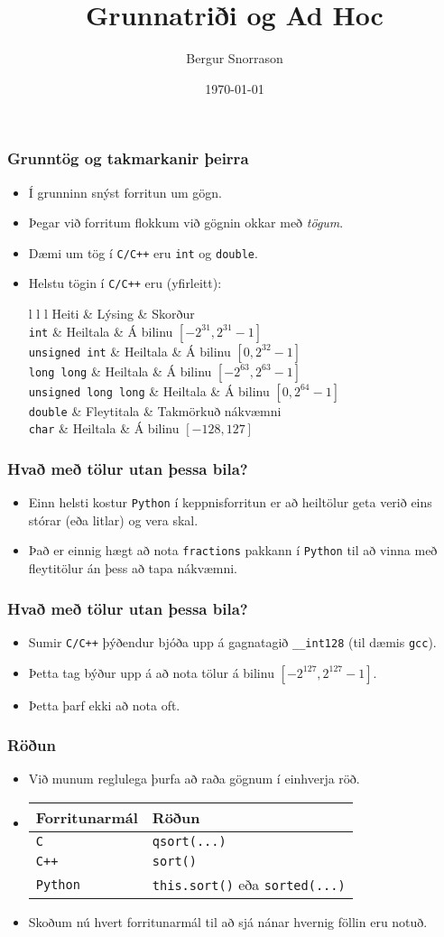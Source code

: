 \documentclass{beamer}
\title{Grunnatriði og Ad Hoc}
\author{Bergur Snorrason}
\date{\today}
\newcommand\env[2]
{
	\begin{#1}
	#2
	\end{#1}
}
\newcommand\code[1]{\tiny}
\begin{document}
\frame{\titlepage}

\env{frame}
{
	\frametitle{Grunntög og takmarkanir þeirra}
	\env{itemize}
	{
		\item<1-> Í grunninn snýst forritun um gögn.
		\item<2-> Þegar við forritum flokkum við gögnin okkar með \emph{tögum}.
		\item<3-> Dæmi um tög í \texttt{C/C++} eru \texttt{int} og \texttt{double}.
		\item<4-> Helstu tögin í \texttt{C/C++} eru (yfirleitt):
		\env{tabular}
		{
			{l l l}
			Heiti & Lýsing & Skorður\\
			\texttt{int} & Heiltala & Á bilinu $[-2^{31}, 2^{31} - 1]$\\
			\texttt{unsigned int} & Heiltala & Á bilinu $[0, 2^{32} - 1]$\\
			\texttt{long long} & Heiltala & Á bilinu $[-2^{63}, 2^{63} - 1]$\\
			\texttt{unsigned long long} & Heiltala & Á bilinu $[0, 2^{64} - 1]$\\
			\texttt{double} & Fleytitala & Takmörkuð nákvæmni\\
			\texttt{char} & Heiltala & Á bilinu $[-128, 127]$\\
		}
	}
}

\env{frame}
{
	\frametitle{Hvað með tölur utan þessa bila?}
	\env{itemize}
	{
		\item<1-> Einn helsti kostur \texttt{Python} í keppnisforritun er að heiltölur geta verið eins stórar (eða litlar) og vera skal.
		\pause \code{fact.py}
		\pause \code{fact.out}
		\item<4-> Það er einnig hægt að nota \texttt{fractions} pakkann í \texttt{Python} til að vinna með fleytitölur án þess að tapa nákvæmni.
	}
}

\env{frame}
{
	\frametitle{Hvað með tölur utan þessa bila?}
	\env{itemize}
	{
		\item<1-> Sumir \texttt{C/C++} þýðendur bjóða upp á gagnatagið \texttt{\_\_int128} (til dæmis \texttt{gcc}).
		\item<2-> Þetta tag býður upp á að nota tölur á bilinu $[-2^{127}, 2^{127} - 1]$.
		\item<3-> Þetta þarf ekki að nota oft.
	}
}

\env{frame}
{
	\frametitle{Röðun}
	\env{itemize}
	{
		\item<1-> Við munum reglulega þurfa að raða gögnum í einhverja röð.
		\item<2-> 
		\pause
		\begin{tabular}{l l}
			Forritunarmál & Röðun\\
			\hline
			\texttt{C} & \texttt{qsort(...)}\\
			\texttt{C++} & \texttt{sort()}\\
			\texttt{Python} & \texttt{this.sort()} eða \texttt{sorted(...)}\\
		\end{tabular}
		\item<3-> Skoðum nú hvert forritunarmál til að sjá nánar hvernig föllin eru notuð.
	}
}
\end{document}

